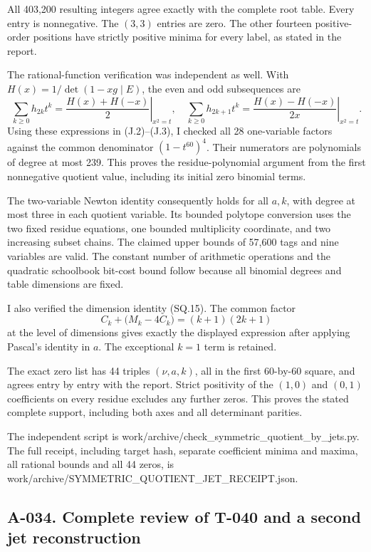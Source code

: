 \documentclass[
  10pt,
]{article}
\begin{document}
All 403,200 resulting integers agree exactly with the complete root
table. Every entry is nonnegative. The \((3,3)\) entries are zero. The
other fourteen positive-order positions have strictly positive minima
for every label, as stated in the report.

The rational-function verification was independent as well. With
\(H(x)=1/\det(1-xg\mid E)\), the even and odd subsequences are \[
\sum_{k\ge0}h_{2k}t^k
=\left.\frac{H(x)+H(-x)}2\right|_{x^2=t},
\quad
\sum_{k\ge0}h_{2k+1}t^k
=\left.\frac{H(x)-H(-x)}{2x}\right|_{x^2=t}.
\] Using these expressions in (J.2)--(J.3), I checked all 28
one-variable factors against the common denominator \((1-t^{60})^4\).
Their numerators are polynomials of degree at most 239. This proves the
residue-polynomial argument from the first nonnegative quotient value,
including its initial zero binomial terms.

The two-variable Newton identity consequently holds for all \(a,k\),
with degree at most three in each quotient variable. Its bounded
polytope conversion uses the two fixed residue equations, one bounded
multiplicity coordinate, and two increasing subset chains. The claimed
upper bounds of 57,600 tags and nine variables are valid. The constant
number of arithmetic operations and the quadratic schoolbook bit-cost
bound follow because all binomial degrees and table dimensions are
fixed.

I also verified the dimension identity (SQ.15). The common factor \[
C_k+\bigl(M_k-4C_k\bigr)=(k+1)(2k+1)
\] at the level of dimensions gives exactly the displayed expression
after applying Pascal's identity in \(a\). The exceptional \(k=1\) term
is retained.

The exact zero list has 44 triples \((\nu,a,k)\), all in the first
60-by-60 square, and agrees entry by entry with the report. Strict
positivity of the \((1,0)\) and \((0,1)\) coefficients on every residue
excludes any further zeros. This proves the stated complete support,
including both axes and all determinant parities.

The independent script is
work/archive/check\_symmetric\_quotient\_by\_jets.py. The full receipt,
including target hash, separate coefficient minima and maxima, all
rational bounds and all 44 zeros, is
work/archive/SYMMETRIC\_QUOTIENT\_JET\_RECEIPT.json.

\subsection{A-034. Complete review of T-040 and a second jet
reconstruction}\label{a-034.-complete-review-of-t-040-and-a-second-jet-reconstruction}
\end{document}
